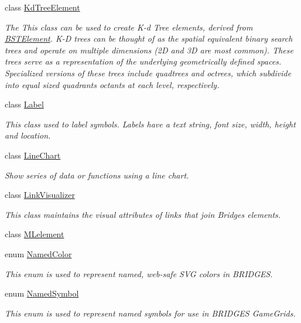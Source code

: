 \begin{DoxyCompactItemize}
class \mbox{\hyperlink{classbridges_1_1base_1_1_kd_tree_element}{Kd\+Tree\+Element}}
\begin{DoxyCompactList}\small\item\em The This class can be used to create K-\/d Tree elements, derived from \mbox{\hyperlink{classbridges_1_1base_1_1_b_s_t_element}{B\+S\+T\+Element}}. K-\/D trees can be thought of as the spatial equivalent binary search trees and operate on multiple dimensions (2D and 3D are most common). These trees serve as a representation of the underlying geometrically defined spaces. Specialized versions of these trees include quadtrees and octrees, which subdivide into equal sized quadrants octants at each level, respectively. \end{DoxyCompactList}\item 
class \mbox{\hyperlink{classbridges_1_1base_1_1_label}{Label}}
\begin{DoxyCompactList}\small\item\em This class used to label symbols. Labels have a text string, font size, width, height and location. \end{DoxyCompactList}\item 
class \mbox{\hyperlink{classbridges_1_1base_1_1_line_chart}{Line\+Chart}}
\begin{DoxyCompactList}\small\item\em Show series of data or functions using a line chart. \end{DoxyCompactList}\item 
class \mbox{\hyperlink{classbridges_1_1base_1_1_link_visualizer}{Link\+Visualizer}}
\begin{DoxyCompactList}\small\item\em This class maintains the visual attributes of links that join Bridges elements. \end{DoxyCompactList}\item 
class \mbox{\hyperlink{classbridges_1_1base_1_1_m_lelement}{M\+Lelement}}
\item 
enum \mbox{\hyperlink{enumbridges_1_1base_1_1_named_color}{Named\+Color}}
\begin{DoxyCompactList}\small\item\em This enum is used to represent named, web-\/safe S\+VG colors in B\+R\+I\+D\+G\+ES. \end{DoxyCompactList}\item 
enum \mbox{\hyperlink{enumbridges_1_1base_1_1_named_symbol}{Named\+Symbol}}
\begin{DoxyCompactList}\small\item\em This enum is used to represent named symbols for use in B\+R\+I\+D\+G\+ES Game\+Grids. \end{DoxyCompactList}\item 

\end{DoxyCompactItemize}
